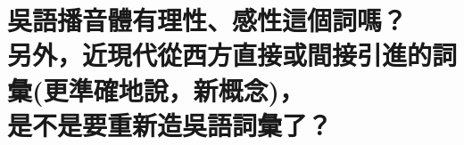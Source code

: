 %

\chapter[吳語播音體有理性、感性這個詞嗎？ 另外，近現代從西方直接或間接引進的詞彙(更準確地說，新概念)， 是不是要重新造吳語詞彙了？]{吳語播音體有理性、感性這個詞嗎？ \\[0.35em] 另外，近現代從西方直接或間接引進的詞彙(更準確地說，新概念)， \\[0.35em] 是不是要重新造吳語詞彙了？}

